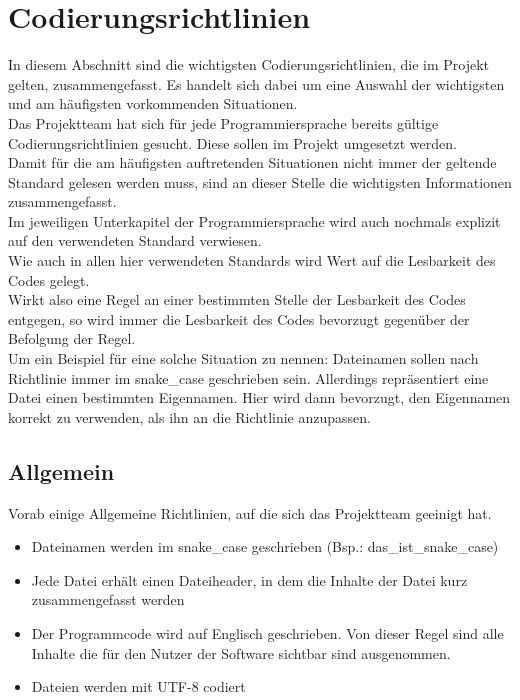 
\chapter{Codierungsrichtlinien}
In diesem Abschnitt sind die wichtigsten Codierungsrichtlinien, die im Projekt gelten, zusammengefasst. Es handelt sich dabei um eine Auswahl der wichtigsten und am häufigsten vorkommenden Situationen.\\

Das Projektteam hat sich für jede Programmiersprache bereits gültige Codierungsrichtlinien gesucht. Diese sollen im Projekt umgesetzt werden. \\

Damit für die am häufigsten auftretenden Situationen nicht immer der geltende Standard gelesen werden muss, sind an dieser Stelle die wichtigsten Informationen zusammengefasst. \\

Im jeweiligen Unterkapitel der Programmiersprache wird auch nochmals explizit auf den verwendeten Standard verwiesen.\\

Wie auch in allen hier verwendeten Standards wird Wert auf die Lesbarkeit des Codes gelegt.\\
Wirkt also eine Regel an einer bestimmten Stelle der Lesbarkeit des Codes entgegen, so wird immer die Lesbarkeit des Codes bevorzugt gegenüber der Befolgung der Regel.\\
Um ein Beispiel für eine solche Situation zu nennen:
Dateinamen sollen nach Richtlinie immer im snake\_case geschrieben sein. Allerdings repräsentiert eine Datei einen bestimmten Eigennamen. Hier wird dann bevorzugt, den Eigennamen korrekt zu verwenden, als ihn an die Richtlinie anzupassen.\\
\section{Allgemein}
Vorab einige Allgemeine Richtlinien, auf die sich das Projektteam geeinigt hat.
\begin{itemize}
\item Dateinamen werden im snake\_case geschrieben (Bsp.: das\_ist\_snake\_case)
\item Jede Datei erhält einen Dateiheader, in dem die Inhalte der Datei kurz zusammengefasst werden
\item Der Programmcode wird auf Englisch geschrieben. Von dieser Regel sind alle Inhalte die für den Nutzer der Software sichtbar sind ausgenommen.
\item Dateien werden mit UTF-8 codiert
\end{itemize}

